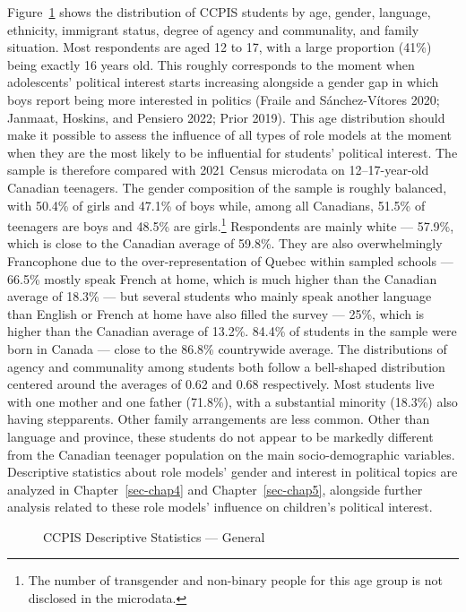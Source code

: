 \documentclass[
  letterpaper,
  DIV=11,
  numbers=noendperiod]{scrreprt}
\begin{document}
Figure~\ref{fig-ccpis1} shows the distribution of CCPIS students by age,
gender, language, ethnicity, immigrant status, degree of agency and
communality, and family situation. Most respondents are aged 12 to 17,
with a large proportion (41\%) being exactly 16 years old. This roughly
corresponds to the moment when adolescents' political interest starts
increasing alongside a gender gap in which boys report being more
interested in politics (Fraile and Sánchez-Vítores 2020; Janmaat,
Hoskins, and Pensiero 2022; Prior 2019). This age distribution should
make it possible to assess the influence of all types of role models at
the moment when they are the most likely to be influential for students'
political interest. The sample is therefore compared with 2021 Census
microdata on 12--17-year-old Canadian teenagers. The gender composition
of the sample is roughly balanced, with 50.4\% of girls and 47.1\% of
boys while, among all Canadians, 51.5\% of teenagers are boys and 48.5\%
are girls.\footnote{The number of transgender and non-binary people for
  this age group is not disclosed in the microdata.} Respondents are
mainly white --- 57.9\%, which is close to the Canadian average of
59.8\%. They are also overwhelmingly Francophone due to the
over-representation of Quebec within sampled schools --- 66.5\% mostly
speak French at home, which is much higher than the Canadian average of
18.3\% --- but several students who mainly speak another language than
English or French at home have also filled the survey --- 25\%, which is
higher than the Canadian average of 13.2\%. 84.4\% of students in the
sample were born in Canada --- close to the 86.8\% countrywide average.
The distributions of agency and communality among students both follow a
bell-shaped distribution centered around the averages of 0.62 and 0.68
respectively. Most students live with one mother and one father
(71.8\%), with a substantial minority (18.3\%) also having stepparents.
Other family arrangements are less common. Other than language and
province, these students do not appear to be markedly different from the
Canadian teenager population on the main socio-demographic variables.
Descriptive statistics about role models' gender and interest in
political topics are analyzed in Chapter~\ref{sec-chap4} and
Chapter~\ref{sec-chap5}, alongside further analysis related to these
role models' influence on children's political interest.

\begin{figure}


\caption{\label{fig-ccpis1}CCPIS Descriptive Statistics --- General}

\end{figure}%
\end{document}
